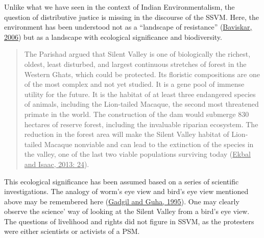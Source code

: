 \documentclass[twoside, 13pt]{article}
\begin{document}
{{{{\fontsize{12}{14}\selectfont Unlike what we have seen in the context of Indian Environmentalism, the question of distributive justice is missing in the discourse of the SSVM. Here, the environment has been understood not as a “landscape of resistance” (\underline{Baviskar, 2006}) but as a landscape with ecological significance and biodiversity.

\begin{quote}
The Parishad argued that Silent Valley is one of biologically the richest, oldest, least disturbed, and largest continuous stretches of forest in the Western Ghats, which could be protected. Its floristic compositions are one of the most complex and not yet studied. It is a gene pool of immense utility for the future. It is the habitat of at least three endangered species of animals, including the Lion-tailed Macaque, the second most threatened primate in the world. The construction of the dam would submerge 830 hectares of reserve forest, including the invaluable riparian ecosystem. The reduction in the forest area will make the Silent Valley habitat of Lion-tailed Macaque nonviable and can lead to the extinction of the species in the valley, one of the last two viable populations surviving today (\underline{Ekbal and Isaac, 2013: 24}).
\end{quote}

This ecological significance has been assumed based on a series of scientific investigations. The analogy of worm’s eye view and bird’s eye view mentioned above may be remembered here (\underline{Gadgil and Guha, 1995}). One may clearly observe the science’ way of looking at the Silent Valley from a bird’s eye view. The questions of livelihood and rights did not figure in SSVM, as the protesters were either scientists or activists of a PSM.

\newpage

}}}}
\end{document}
